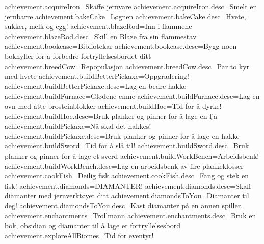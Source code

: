 achievement.acquireIron=Skaffe jernvare
achievement.acquireIron.desc=Smelt en jernbarre
achievement.bakeCake=Løgnen
achievement.bakeCake.desc=Hvete, sukker, melk og egg!
achievement.blazeRod=Inn i flammene
achievement.blazeRod.desc=Skill en Blaze fra sin flammestav
achievement.bookcase=Bibliotekar
achievement.bookcase.desc=Bygg noen bokhyller for å forbedre fortryllelsesbordet ditt
achievement.breedCow=Repopulasjon
achievement.breedCow.desc=Par to kyr med hvete
achievement.buildBetterPickaxe=Oppgradering!
achievement.buildBetterPickaxe.desc=Lag en bedre hakke
achievement.buildFurnace=Glødene emne
achievement.buildFurnace.desc=Lag en ovn med åtte brosteinblokker
achievement.buildHoe=Tid for å dyrke!
achievement.buildHoe.desc=Bruk planker og pinner for å lage en ljå
achievement.buildPickaxe=Nå skal det hakkes!
achievement.buildPickaxe.desc=Bruk planker og pinner for å lage en hakke
achievement.buildSword=Tid for å slå til!
achievement.buildSword.desc=Bruk planker og pinner for å lage et sverd
achievement.buildWorkBench=Arbeidsbenk!
achievement.buildWorkBench.desc=Lag en arbeidsbenk av fire plankeklosser
achievement.cookFish=Deilig fisk
achievement.cookFish.desc=Fang og stek en fisk!
achievement.diamonds=DIAMANTER!
achievement.diamonds.desc=Skaff diamanter med jernverktøyet ditt
achievement.diamondsToYou=Diamanter til deg!
achievement.diamondsToYou.desc=Kast diamanter på en annen spiller.
achievement.enchantments=Trollmann
achievement.enchantments.desc=Bruk en bok, obsidian og diamanter til å lage et fortryllelsesbord
achievement.exploreAllBiomes=Tid for eventyr!

